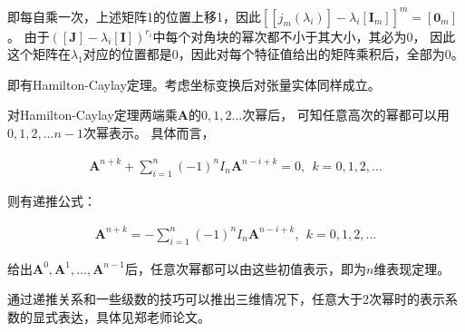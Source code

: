 \documentclass[UTF8,zihao=5]{ctexart}
\newcommand{\bm}[1]{{\mathbf{#1}}}
\begin{document}
即每自乘一次，上述矩阵1的位置上移1，因此$\left[[j_m(\lambda_i)]-\lambda_i[\bm{I}_m]\right]^m=[\bm{0}_m]$。
由于$([\bm{J}]-\lambda_i[\bm{I}])^{r_i}$中每个对角块的幂次都不小于其大小，其必为0，
因此这个矩阵在$\lambda_1$对应的位置都是0，因此对每个特征值给出的矩阵乘积后，全部为0。

即有Hamilton-Caylay定理。考虑坐标变换后对张量实体同样成立。

对Hamilton-Caylay定理两端乘$\bm{A}$的$0,1,2...$次幂后，
可知任意高次的幂都可以用$0,1,2,...n-1$次幂表示。
具体而言，

\begin{equation}
    \begin{aligned}
        \bm{A}^{n+k}+\sum_{i=1}^n{(-1)^nI_n\bm{A}^{n-i+k}}=0,\ \ k=0,1,2,...
    \end{aligned}
\end{equation}

则有递推公式：

\begin{equation}
    \begin{aligned}
        \bm{A}^{n+k}=-\sum_{i=1}^n{(-1)^nI_n\bm{A}^{n-i+k}},\ \ k=0,1,2,...
    \end{aligned}
\end{equation}

给出$\bm{A}^0,\bm{A}^1,\dots,\bm{A}^{n-1}$后，任意次幂都可以由这些初值表示，即为$n$维表现定理。

通过递推关系和一些级数的技巧可以推出三维情况下，任意大于2次幂时的表示系数的显式表达，具体见郑老师论文。








\end{document}
